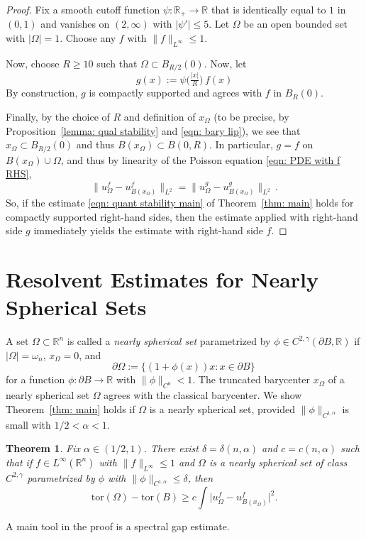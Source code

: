 \documentclass[10pt,a4paper]{amsart}
\numberwithin{equation}{section}
\newtheorem{theorem}{Theorem}[section]
\def\R{{\mathbb R}}
\def\W{\Omega}
\def\om{\omega}
\def\tor{\mathrm{tor}}
\begin{document}
 \begin{proof}
 Fix a smooth cutoff function $\psi:\R_+\to \R$ that is identically equal to $1$ in $(0,1)$ and vanishes on $(2,\infty)$ with $|\psi'|\leq 5$. 
Let $\W$ be an open bounded set with $|\W| = 1$.
  Choose any $f$ with $\| f\|_{L^{\infty}} \leq 1$.   
  
  Now, choose $R\geq 10$ such that $\W \subset B_{R/2}(0)$. Now, let 
 \[
{g(x)  := \psi\Big(\tfrac{|x|}{R}\Big) \,f(x)}
 \]
 By construction, $g$ is compactly supported and agrees with {$f$} in $B_R(0)$.
 
 Finally, by the choice of $R$ and definition of $x_\W$ (to be precise, by Proposition~\ref{lemma: qual stability} and \eqref{eqn: bary lip}), we see that $x_\W \subset B_{R/2}(0)$ and thus $B(x_{{\W}}) \subset B(0, R)$. 
 In particular, $g=f$ on $B({x_\W})\cup \W$, and thus by linearity of the Poisson equation \eqref{eqn: PDE with f RHS}, 
 \[
 \big\| u_\W^f - u_{B(x_\W)}^f \big\|_{L^2} =  \big\| u_\W^g - u_{B(x_\W)}^g \big\|_{L^2}\,.
 \]
 So, if the estimate \eqref{eqn: quant stability main} of Theorem~\ref{thm: main} holds for compactly supported right-hand sides, then the estimate applied with right-hand side $g$ immediately yields the estimate with right-hand side $f$. 
 \end{proof}



%
\section{Resolvent Estimates for Nearly Spherical Sets}\label{sec: linear stability}
A set $\Omega\subset \R^n$ is called a {\it nearly spherical set} parametrized by $\phi \in C^{2,\gamma}(\partial B, \mathbb{R})$
 if $|\W|=\om_n$,  $x_\W =0$, and 
\[
\partial \Omega :=  \{ (1+\phi(x))x :  x \in \partial B\}\,
\]
for a function $\phi : \partial B\to \R$ with $\|\phi\|_{C^0}< 1.$ The truncated barycenter $x_\W$ of a nearly spherical set $\W$ agrees with the classical barycenter. We show Theorem~\ref{thm: main} holds if $\W$ is a nearly spherical set, provided $\|\phi\|_{C^{1,\alpha}}$ is small with $1/2< \alpha < 1$.
\begin{theorem}\label{cor: Fuglede}
	Fix {$\alpha \in (1/2,1)$}. There exist $\delta = \delta(n,\alpha)$  and $c=c(n,\alpha)$ such that if $f \in L^\infty(\R^n)$ with $\|f \|_{L^\infty}\leq 1$ and  $\W$ is a nearly spherical set of class $C^{2,\gamma}$ parametrized by $\phi$ with $\| \phi\|_{C^{1,\alpha}} \leq \delta$, then
\[
\tor(\W) - \tor(B) \geq c \int \big| u_\W^f - u_{B({x_\W})}^f\big|^2.  
\]
\end{theorem}  
A main tool in the proof is a spectral gap estimate.   
\end{document}
